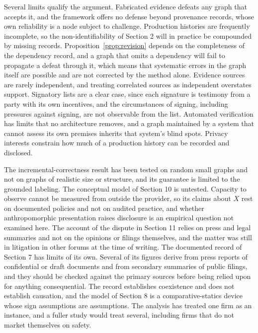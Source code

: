 \documentclass[12pt]{article}
\theoremstyle{definition}
\theoremstyle{remark}
\begin{document}
Several limits qualify the argument. Fabricated evidence defeats any graph that accepts it, and the framework offers no defense beyond provenance records, whose own reliability is a node subject to challenge. Production histories are frequently incomplete, so the non-identifiability of Section 2 will in practice be compounded by missing records. Proposition~\ref{prop:revision} depends on the completeness of the dependency record, and a graph that omits a dependency will fail to propagate a defeat through it, which means that systematic errors in the graph itself are possible and are not corrected by the method alone. Evidence sources are rarely independent, and treating correlated sources as independent overstates support. Signatory lists are a clear case, since each signature is testimony from a party with its own incentives, and the circumstances of signing, including pressures against signing, are not observable from the list. Automated verification has limits that no architecture removes, and a graph maintained by a system that cannot assess its own premises inherits that system's blind spots. Privacy interests constrain how much of a production history can be recorded and disclosed.

The incremental-correctness result has been tested on random small graphs and not on graphs of realistic size or structure, and its guarantee is limited to the grounded labeling. The conceptual model of Section 10 is untested. Capacity to observe cannot be measured from outside the provider, so its claims about $X$ rest on documented policies and not on audited practice, and whether anthropomorphic presentation raises disclosure is an empirical question not examined here. The account of the dispute in Section 11 relies on press and legal summaries and not on the opinions or filings themselves, and the matter was still in litigation in other forums at the time of writing. The documented record of Section 7 has limits of its own. Several of its figures derive from press reports of confidential or draft documents and from secondary summaries of public filings, and they should be checked against the primary sources before being relied upon for anything consequential. The record establishes coexistence and does not establish causation, and the model of Section 8 is a comparative-statics device whose sign assumptions are assumptions. The analysis has treated one firm as an instance, and a fuller study would treat several, including firms that do not market themselves on safety.
\end{document}

